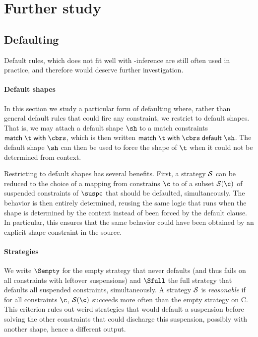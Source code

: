 \section {Further study}

\subsection {Defaulting}
\label {app/default-rules}

Default rules, which does not fit well with \geninst-inference are still
often used in practice, and therefore would deserve further investigation.

\paragraph {Default shapes}

In this section we study a particular form of defaulting where, rather than
general default rules that could fire any constraint, we restrict to default
shapes. That is, we may attach a default shape $\sh$ to a match constraints
$\cmatch \t \cbrs$, which is then written $\cmatch \t \cbrs \cdefault
\sh$. The default shape $\sh$ can then be used to force the shape of
$\t$ when it could not be determined from context.


Restricting to default shapes has several benefits.  First, a strategy $\S$
can be reduced to the choice of a mapping from constrains $\c$ to of a
subset $\Sfire \S \c$ of suspended constraints of $\suspc$ that should be
defaulted, simultaneously.  The behavior is then entirely determined,
reusing the same logic that runs when the shape is determined by the context
instead of been forced by the default clause.  In particular, this ensures
that the same behavior could have been obtained by an explicit shape
constraint in the source.

\paragraph {Strategies}

We write $\Sempty$ for the empty strategy that never defaults (and thus fails
on all constraints with leftover suspensions) and $\Sfull$ the full strategy
that defaults all suspended constraints, simultaneously.
A strategy $\S$ is \emph{reasonable} if for all constraints
$\c$, $\S (\c)$ succeeds more often than the empty strategy on C.
%
This criterion rules out weird strategies that would default a suspension
before solving the other constraints that could discharge this suspension,
possibly with another shape, hence a different output.

